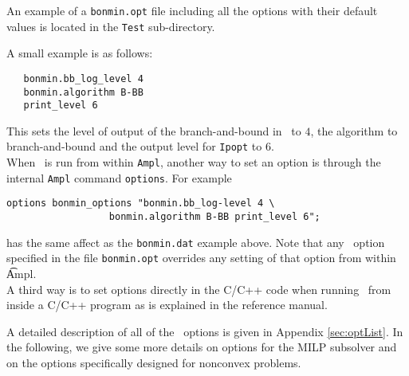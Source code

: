 An example of a {\tt bonmin.opt} file including all the options
with their default values is located in the {\tt Test}
sub-directory.

A small example is as follows:
\begin{verbatim}
   bonmin.bb_log_level 4
   bonmin.algorithm B-BB
   print_level 6
\end{verbatim}
This sets the level of output of the branch-and-bound in \Bonmin\ to $4$, the algorithm to branch-and-bound
and the output level for {\tt Ipopt} to $6$.\\

When \Bonmin\ is run from within {\tt Ampl}, another way to set
an option is through the
internal {\tt Ampl} command {\tt options}.
For example
\begin{verbatim}
options bonmin_options "bonmin.bb_log-level 4 \
                  bonmin.algorithm B-BB print_level 6";
\end{verbatim}
has the same affect as the {\tt bonmin.dat} example above.
Note that any \Bonmin\ option specified in the file {\tt bonmin.opt}
overrides any setting of that option from within {\t Ampl}.\\

A third way is to set options directly in the C/C++ code when
running \Bonmin\ from inside a C/C++ program as is explained in the reference manual.

A detailed description of all of the \Bonmin\ options is given in Appendix \ref{sec:optList}.
In the following, we give some more details on options for the MILP subsolver and
on the options specifically designed
for nonconvex problems.\\

